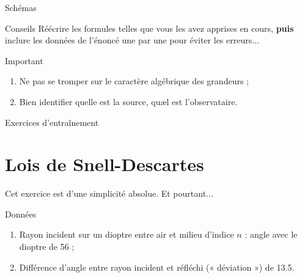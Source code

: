 \documentclass[../main/main.tex]{subfiles}
\begin{document}
\begin{NCexem}{Schémas}
\begin{minipage}{0.5\linewidth}
\begin{center}
        \end{center} 
    \end{minipage}
\end{NCexem}

\begin{tcbraster}[raster columns=5, raster equal height=rows]
    \begin{NCcoro}[raster multicolumn=2]{Conseils}
        Réécrire les formules telles que vous les avez apprises en cours,
        \textbf{puis} inclure les données de l'énoncé une par une pour éviter les
        erreurs...
    \end{NCcoro}    
    \begin{NCimpo}[raster multicolumn=3]{Important}
        \begin{enumerate}
            \item Ne pas se tromper sur le caractère {\huge algébrique} des
                grandeurs ;
            \item Bien identifier quelle est la source, quæl est l'observataire.
        \end{enumerate}
    \end{NCimpo}
\end{tcbraster}

\newpage

\begin{center}
    \Huge Exercices d'entraînement
\end{center}

\setcounter{section}{5}
\section{Lois de Snell-Descartes}
Cet exercice est d'une simplicité absolue. Et pourtant...
\begin{NCdefi}{Données}
    \begin{enumerate}
        \item Rayon incident sur un dioptre entre air et milieu d'indice $n$ :
            angle {\huge avec le dioptre} de \SI{56}{\degres} ;
        \item Différence d'angle entre rayon incident et réfléchi (« déviation
            ») de \SI{13.5}{\degres}.
    \end{enumerate}
\end{NCdefi}
\end{document}
